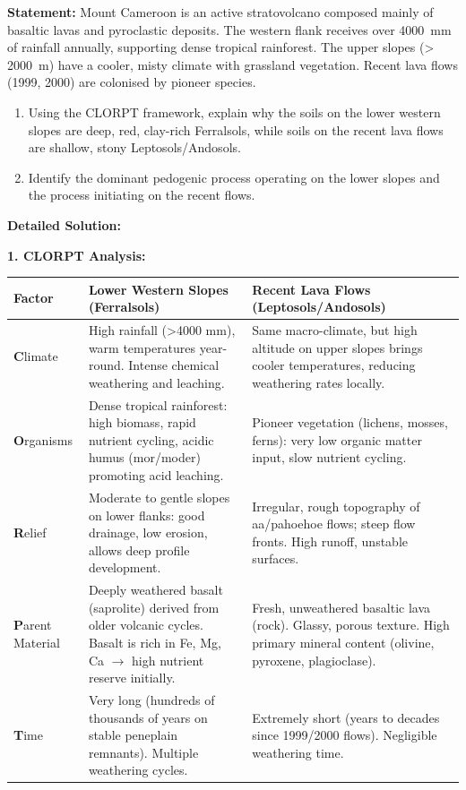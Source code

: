 \documentclass[11pt]{article}
\begin{document}
\begin{exoresolu}
\textbf{Statement:} Mount Cameroon is an active stratovolcano composed mainly of basaltic lavas and pyroclastic deposits. The western flank receives over \SI{4000}{mm} of rainfall annually, supporting dense tropical rainforest. The upper slopes (> \SI{2000}{m}) have a cooler, misty climate with grassland vegetation. Recent lava flows (1999, 2000) are colonised by pioneer species. 
\begin{enumerate}
\item Using the CLORPT framework, explain why the soils on the lower western slopes are deep, red, clay-rich Ferralsols, while soils on the recent lava flows are shallow, stony Leptosols/Andosols.
\item Identify the dominant pedogenic process operating on the lower slopes and the process initiating on the recent flows.
\end{enumerate}

\tcblower
\textbf{Detailed Solution:}

\noindent\textbf{1. CLORPT Analysis:}

\begin{center}
\begin{tabularx}{\linewidth}{|l|X|X|}\hline
\rowcolor{popblueL}
\textbf{Factor} & \textbf{Lower Western Slopes (Ferralsols)} & \textbf{Recent Lava Flows (Leptosols/Andosols)} \\ \hline
\textbf{C}limate & High rainfall (\textgreater 4000 mm), warm temperatures year-round. Intense chemical weathering and leaching. & Same macro-climate, but high altitude on upper slopes brings cooler temperatures, reducing weathering rates locally. \\ \hline
\textbf{O}rganisms & Dense tropical rainforest: high biomass, rapid nutrient cycling, acidic humus (mor/moder) promoting acid leaching. & Pioneer vegetation (lichens, mosses, ferns): very low organic matter input, slow nutrient cycling. \\ \hline
\textbf{R}elief & Moderate to gentle slopes on lower flanks: good drainage, low erosion, allows deep profile development. & Irregular, rough topography of aa/pahoehoe flows; steep flow fronts. High runoff, unstable surfaces. \\ \hline
\textbf{P}arent Material & Deeply weathered basalt (saprolite) derived from older volcanic cycles. Basalt is rich in Fe, Mg, Ca $\rightarrow$ high nutrient reserve initially. & Fresh, unweathered basaltic lava (rock). Glassy, porous texture. High primary mineral content (olivine, pyroxene, plagioclase). \\ \hline
\textbf{T}ime & Very long (hundreds of thousands of years on stable peneplain remnants). Multiple weathering cycles. & Extremely short (years to decades since 1999/2000 flows). Negligible weathering time. \\ \hline
\end{tabularx}
\end{center}


\end{exoresolu}
\end{document}
